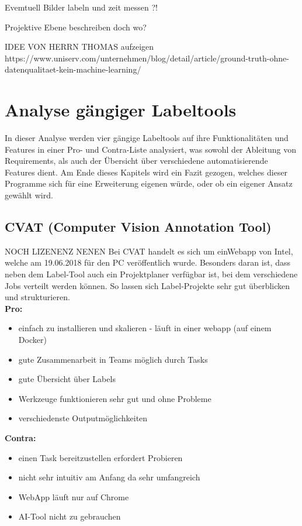 \documentclass[11pt]{scrartcl}
\begin{document}
Evemtuell Bilder labeln und zeit messen ?!

Projektive Ebene beschreiben doch wo?


IDEE VON HERRN THOMAS aufzeigen
https://www.uniserv.com/unternehmen/blog/detail/article/ground-truth-ohne-datenqualitaet-kein-machine-learning/

\newpage

\section{Analyse gängiger Labeltools}
\label{sec:Analyse gängiger Labeltools}
In dieser Analyse werden vier gängige Labeltools auf ihre Funktionalitäten und Features in einer Pro- und Contra-Liste analysiert, was sowohl der Ableitung von Requirements, als auch der Übersicht über verschiedene automatisierende Features dient. Am Ende dieses Kapitels wird ein Fazit gezogen, welches dieser Programme sich für eine Erweiterung eigenen würde, oder ob ein eigener Ansatz gewählt wird.

\subsection{CVAT (Computer Vision Annotation Tool)}
\label{sec:CVAT (Computer Vision Annotation Tool)}

NOCH LIZENENZ NENEN
Bei CVAT handelt es sich um einWebapp von Intel, welche am 19.06.2018 für den PC veröffentlich wurde. Besonders daran ist, dass neben dem Label-Tool auch ein Projektplaner verfügbar ist, bei dem verschiedene Jobs verteilt werden können. So lassen sich Label-Projekte sehr gut überblicken und strukturieren. 
\\

\textbf{Pro:} 
\begin{itemize}
	\item einfach zu installieren und skalieren - läuft in einer webapp (auf einem Docker)
	\item gute Zusammenarbeit in Teams möglich durch Tasks
	\item gute Übersicht über Labels
	\item Werkzeuge funktionieren sehr gut und ohne Probleme 
	\item verschiedenste Outputmöglichkeiten 
\end{itemize}
\textbf{Contra:} 
\begin{itemize}
	\item einen Task bereitzustellen erfordert Probieren
	\item nicht sehr intuitiv am Anfang da sehr umfangreich
	\item WebApp läuft nur auf Chrome
	\item AI-Tool nicht zu gebrauchen
\end{itemize}
\end{document}
